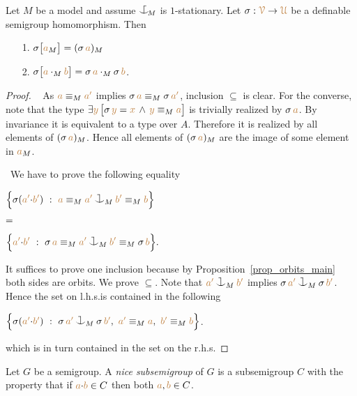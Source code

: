 \documentclass[creche.tex]{subfiles}
\begin{document}
\begin{proposition}\label{prop_HJ_tecnical}
Let $M$ be a model and assume $\nonforkc_{\!M}$ is $1$-stationary.
Let $\sigma:{\color{brown}\EuScript V}\to{\color{brown}\EuScript U}$ be a definable semigroup homomorphism.
Then 
\begin{itemize}
\item[1.] $\sigma\big[{\color{brown} a}_M\big]=(\sigma\,{\color{brown} a})_M$

\item[2.]
$\sigma\big[{\color{brown} a}\cdot_M{\color{brown} b}\big]=\sigma\,{\color{brown} a}\cdot_M\sigma\,{\color{brown} b}$.
\end{itemize}
\end{proposition}
\begin{proof}\   
As ${\color{brown} a}\equiv_M{\color{brown} a'}$ implies $\sigma\,{\color{brown} a}\equiv_M\sigma\,{\color{brown} a'}$,
inclusion $\subseteq$ is clear. 
For the converse, note that the type 
$\exists{\color{brown}y}\,\big[\sigma\,{\color{brown} y}={\color{brown} x}\,\wedge\,{\color{brown} y}\equiv_M{\color{brown} a}\big]$ 
is trivially realized by $\sigma\,{\color{brown} a}$.
By invariance it is equivalent to a type over $A$.
Therefore it is realized by all elements of $(\sigma\,{\color{brown} a})_M$.
Hence all elements of $(\sigma\,{\color{brown} a})_M$ are the image of some element in ${\color{brown} a}_M$.

\def\medrel#1{\parbox[t]{6ex}{$\displaystyle\hfil #1$}}
\def\ceq#1#2#3{\parbox[t]{39ex}{$\displaystyle #1$}\medrel{#2}{$\displaystyle #3$}}
 \  
We have to prove the following equality\smallskip

\ceq{\hfill\Big\{\sigma({\mr a'}{\cdot}{\mr b'})\ :\ {\mr a}\equiv_M{\mr a'}\cnonfork_M{\mr b'}\equiv_M{\mr b} \Big\}}
{=}
{\Big\{{\mr a'}{\cdot}{\mr b'}\ :\ \sigma\,{\mr a}\equiv_M{\mr a'}\cnonfork_M{\mr b'}\equiv_M\sigma\,{\mr b} \Big\}.}\smallskip

It suffices to prove one inclusion because by Proposition~\ref{prop_orbits_main} both sides are orbits. 
We prove $\subseteq$. 
Note that ${\mr a'}\cnonfork_M{\mr b'}$ implies $\sigma\,{\mr a'}\cnonfork_M\sigma\,{\mr b'}$.
Hence the set on l.h.s.\@ is contained in the following\smallskip

\hfil$\Big\{\sigma({\mr a'}{\cdot}{\mr b'})\ :\ \sigma\,{\mr a'}\cnonfork_M\sigma\,{\mr b'},\ {\mr a'}\equiv_M{\mr a},\  {\mr b'}\equiv_M{\mr b} \Big\}$.\smallskip

which is in turn contained in the set on the r.h.s.
\end{proof}

Let $G$ be a semigroup.
A \emph{nice subsemigroup\/} of $G$ is a subsemigroup $C$ with the property that if ${\color{brown} a}{\cdot}{\color{brown} b}\in C$ then both ${\color{brown} a},{\color{brown} b}\in C$.
\end{document}
